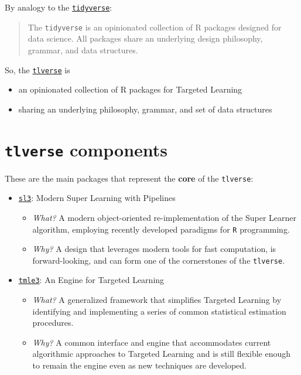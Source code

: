 \documentclass[
  12pt, krantz2,
]{book}
\newcommand{\passthrough}[1]{#1}
\providecommand{\tightlist}{%
  \setlength{\itemsep}{0pt}\setlength{\parskip}{0pt}}
\theoremstyle{definition}
\theoremstyle{definition}
\theoremstyle{definition}
\newcommand{\1}{\mathbbm{1}}
\begin{document}
By analogy to the \href{https://tidyverse.org/}{\passthrough{\lstinline!tidyverse!}}:

\begin{quote}
The \passthrough{\lstinline!tidyverse!} is an opinionated collection of R packages designed for data
science. All packages share an underlying design philosophy, grammar, and data
structures.
\end{quote}

So, the \href{https://tlverse.org}{\passthrough{\lstinline!tlverse!}} is

\begin{itemize}
\tightlist
\item
  an opinionated collection of R packages for Targeted Learning
\item
  sharing an underlying philosophy, grammar, and set of data structures
\end{itemize}

\hypertarget{tlverse-components}{%
\section{\texorpdfstring{\texttt{tlverse} components}{tlverse components}}\label{tlverse-components}}

These are the main packages that represent the \textbf{core} of the \passthrough{\lstinline!tlverse!}:

\begin{itemize}
\tightlist
\item
  \href{https://github.com/tlverse/sl3}{\passthrough{\lstinline!sl3!}}: Modern Super Learning with Pipelines

  \begin{itemize}
  \tightlist
  \item
    \emph{What?} A modern object-oriented re-implementation of the Super Learner
    algorithm, employing recently developed paradigms for \passthrough{\lstinline!R!} programming.
  \item
    \emph{Why?} A design that leverages modern tools for fast computation, is
    forward-looking, and can form one of the cornerstones of the \passthrough{\lstinline!tlverse!}.
  \end{itemize}
\item
  \href{https://github.com/tlverse/tmle3}{\passthrough{\lstinline!tmle3!}}: An Engine for Targeted Learning

  \begin{itemize}
  \tightlist
  \item
    \emph{What?} A generalized framework that simplifies Targeted Learning by
    identifying and implementing a series of common statistical estimation
    procedures.
  \item
    \emph{Why?} A common interface and engine that accommodates current algorithmic
    approaches to Targeted Learning and is still flexible enough to remain the
    engine even as new techniques are developed.
  \end{itemize}
\end{itemize}
\end{document}
